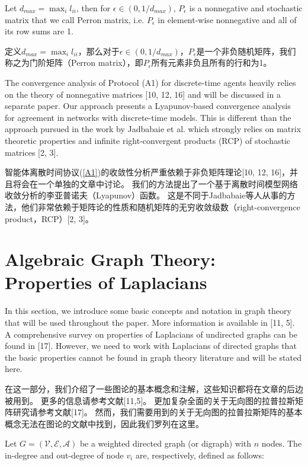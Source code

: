 \documentclass{article}
\begin{document}
\noindent Let $d_{max} = \max_il_{ii}$, then for $\epsilon\in (0,1/d_{max})$, $P_\epsilon$ is a nonnegative and stochastic matrix that we call Perron matrix, i.e. $P_\epsilon$ in element-wise nonnegative and all of its row sums are 1.

\noindent 定义$d_{max} = \max_il_{ii}$，那么对于$\epsilon\in (0,1/d_{max})$，$P_\epsilon$是一个非负随机矩阵，我们称之为门阶矩阵（Perron matrix），即$P_\epsilon$所有元素非负且所有的行和为1。

{\color[gray]{0.5}
The convergence analysis of Protocol (A1) for discrete-time agents heavily relies on the theory of nonnegative matrices [10, 12, 16] and will be discussed in a separate paper. 
Our approach presents a Lyapunov-based convergence analysis for agreement in networks with discrete-time models. 
This is diﬀerent than the approach pursued in the work by Jadbabaie et al. which strongly relies on matrix theoretic properties and {\color{green}inﬁnite right-convergent products (RCP) of stochastic matrices [2, 3]}.
}

智能体离散时间协议(\ref{A1})的收敛性分析严重依赖于非负矩阵理论[10, 12, 16]，并且将会在一个单独的文章中讨论。
我们的方法提出了一个基于离散时间模型网络收敛分析的李亚普诺夫（Lyapunov）函数。
这是不同于Jadbabaie等人从事的方法，他们非常依赖于矩阵论的性质和随机矩阵的无穷收敛级数（right-convergence product，RCP）[2, 3]。

\section{Algebraic Graph Theory: Properties of Laplacians}
{\color[gray]{0.5}
\noindent In this section, we introduce some basic concepts and notation in graph theory that will be used throughout the paper. 
More information is available in [11, 5]. 
A comprehensive survey on properties of Laplacians of undirected graphs can be found in [17]. 
However, we need to work with Laplacians of directed graphs that the basic properties cannot be found in graph theory literature and will be stated here.
}

\noindent 在这一部分，我们介绍了一些图论的基本概念和注解，这些知识都将在文章的后边被用到。
更多的信息请参考文献[11,5]。
更加复杂全面的关于无向图的拉普拉斯矩阵研究请参考文献[17]。
然而，我们需要用到的关于无向图的拉普拉斯矩阵的基本概念无法在图论的文献中找到，因此我们罗列在这里。

{\color[gray]{0.5}
Let $G=(\mathcal{V}, \mathcal{E}, \mathcal{A})$ be a weighted directed graph (or digraph) with $n$ nodes. 
The in-degree and out-degree of node $v_i$ are, respectively, deﬁned as follows:
}
\end{document}
